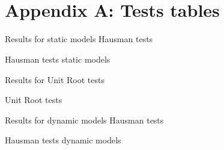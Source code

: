 \documentclass[]{article}
\begin{document}
\appendix
\section{\\Appendix A: Tests tables}

Results for static models Hausman tests

\begin{table}[ht]
	\centering
	
	\caption{Hausman tests static models \label{tab:AppHausmanStatic}} 
	
	
\end{table}

Results for Unit Root tests
\begin{landscape}
\begin{table}[ht]
	\centering
	
	\caption{Unit Root tests \label{tab:AppUnitRoots}} 
	
	
\end{table}
\end{landscape}




Results for dynamic models Hausman tests

\begin{table}[ht]
	\centering

\caption{Hausman tests dynamic models \label{tab:AppendixHausman}} 


\end{table}
\end{document}
